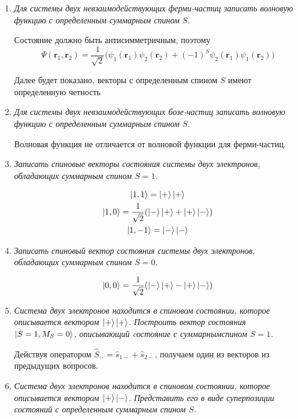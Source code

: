 \documentclass{article}
\begin{document}
\begin{enumerate}
	\item \textit{Для системы двух невзаимодействующих ферми-частиц записать волновую функцию с определенным суммарным спином $S$.}
	
	Состояние должно быть антисимметричным, поэтому
	\begin{equation}
		\Psi(\textbf{r}_1, \textbf{r}_2) = \frac{1}{\sqrt{2}}\big( \psi_1(\textbf{r}_1) \psi_2(\textbf{r}_2) + (-1)^S \psi_2(\textbf{r}_1) \psi_1(\textbf{r}_2) \big)
	\end{equation}
	
	Далее будет показано, векторы с определенным спином $S$ имеют определенную четность
	
	\item \textit{Для системы двух невзаимодействующих бозе-частиц записать волновую функцию с определенным суммарным спином $S$.}
	
	Волновая функция не отличается от волновой функции для ферми-частиц.
	
	\item \textit{Записать спиновые векторы состояния системы двух электронов, обладающих суммарным спином $S = 1$.}
	
	\begin{gather}
		\ket{1,1} = \ket{+}\ket{+} \\
		\ket{1,0} = \frac{1}{\sqrt{2}}( \ket{-}\ket{+} + \ket{+}\ket{-}) \\
		\ket{1,-1} = \ket{-}\ket{-}
	\end{gather}
	
	\item \textit{Записать спиновый вектор состояния системы двух электронов, обладающих суммарным спином $S = 0$.}
	
	\begin{equation}
		\ket{0,0} = \frac{1}{\sqrt{2}}( \ket{-}\ket{+} - \ket{+}\ket{-}) 
	\end{equation}
	
	\item \textit{Система двух электронов находится в спиновом состоянии, которое описывается вектором $\ket{+}\ket{+}$. Построить вектор состояния $\ket{S = 1, M_S = 0}$, описывающий cостояние с суммарнымспином $S = 1$.}
	
	Действуя оператором $\hat{S}_- = \hat{s}_{1-} + \hat{s}_{2-}$, получаем один из векторов из предыдущих вопросов.
		
	\item \textit{Система двух электронов находится в спиновом состоянии, которое описывается вектором $\ket{+} \ket{-}$. Представить его в виде суперпозиции состояний с определенным суммарным спином $S$.}
	

\end{enumerate}
\end{document}
